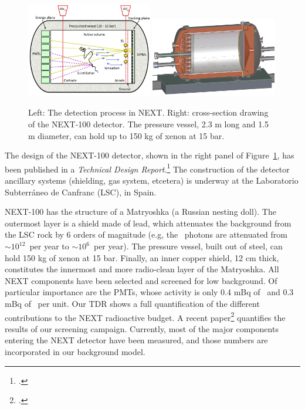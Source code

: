 \begin{figure}
\centering
\includegraphics[width=0.49\textwidth]{img/SOFT.jpg}
\includegraphics[width=0.49\textwidth]{img/NEXT100_full.jpg}
\caption{\small Left: The detection process in NEXT. Right: cross-section drawing of the NEXT-100 detector. The pressure vessel, 2.3 m long and 1.5 m diameter, can hold up to 150 kg of xenon at 15 bar.} \label{fig.SOFT}
\end{figure}


The design of the NEXT-100 detector, shown in the right panel of Figure~\ref{fig.SOFT}, has been published in a \emph{Technical Design Report}.\footcite{Alvarez:2012haa} The construction of the detector ancillary systems (shielding, gas system, etcetera) is underway at the Laboratorio Subterr\'aneo de Canfranc (LSC), in Spain. 

NEXT-100 has the structure of a Matryoshka (a Russian nesting doll). The outermost layer is a shield made of lead, which attenuates the background from the LSC rock by 6 orders of magnitude (e.g, the \TL\ photons are attenuated from $\sim 10^{12}$~per year to $\sim 10^{6}$~per year). The pressure vessel, built out of steel, can hold 150 kg of xenon at 15 bar. Finally, an inner copper shield, 12 cm thick, constitutes the innermost and more radio-clean layer of the Matryoshka. All NEXT components have been selected and screened for low background. Of particular importance are the PMTs, whose activity is only 0.4 mBq of \BI\ and 0.3 mBq of \TL\ per unit. Our TDR shows a full quantification of the different contributions to the NEXT radioactive budget. A recent paper\footcite{Alvarez:2012as} quantifies the results of our screening campaign. Currently, most of the major components entering the NEXT detector have been measured, and those numbers are incorporated in our background model. 

